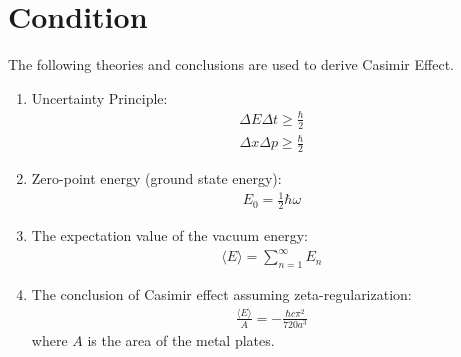 \section{Condition}
The following theories and conclusions are used to derive Casimir Effect.
\begin{enumerate}
    \item Uncertainty Principle:
        \begin{align}\Delta E \Delta t \ge \frac{\hbar}{2}\end{align}
        \begin{align}\Delta x \Delta p \ge \frac{\hbar}{2}\end{align}
    \item Zero-point energy (ground state energy): \begin{align}E_0 = \frac{1}{2}\hbar\omega\end{align}
    \item The expectation value of the vacuum energy: \begin{align}\langle E \rangle = \sum_{n=1}^{\infty} E_n\end{align}
    \item The conclusion of Casimir effect assuming zeta-regularization: 
    \begin{align}\frac{\langle E \rangle}{A} = -\frac{\hbar c \pi^2}{720 a^3}\end{align}
    where \(A\) is the area of the metal plates.
\end{enumerate}
